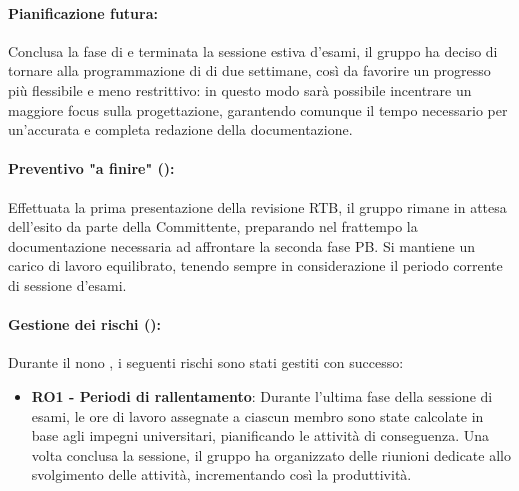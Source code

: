 \paragraph*{Pianificazione futura:}
\par Conclusa la fase di \RTB e terminata la sessione estiva d'esami, il gruppo ha deciso di tornare alla programmazione di  di due settimane, così da favorire un progresso più flessibile e meno restrittivo: in questo modo sarà possibile incentrare un maggiore focus sulla progettazione, garantendo comunque il tempo necessario per un'accurata e completa redazione della documentazione.

\paragraph*{Preventivo "a finire" ():}
\par Effettuata la prima presentazione della revisione RTB, il gruppo rimane in attesa dell'esito da parte della Committente, preparando nel frattempo la documentazione necessaria ad affrontare la seconda fase PB. Si mantiene un carico di lavoro equilibrato, tenendo sempre in considerazione il periodo corrente di sessione d'esami.

\paragraph*{Gestione dei rischi ():}
\par Durante il nono , i seguenti rischi sono stati gestiti con successo:
\begin{itemize}
  \item \textbf{RO1 - Periodi di rallentamento}: Durante l'ultima fase della sessione di esami, le ore di lavoro assegnate a ciascun membro sono state calcolate in base agli impegni universitari, pianificando le attività di conseguenza. Una volta conclusa la sessione, il gruppo ha organizzato delle riunioni dedicate allo svolgimento delle attività, incrementando così la produttività.
\end{itemize}